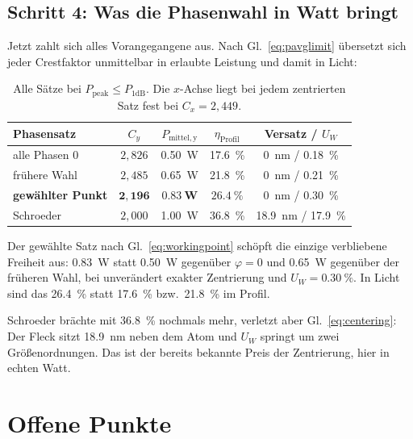 \documentclass[11pt,a4paper]{article}
\newcommand{\crest}{\ensuremath{C}}
\newcommand{\Uw}{\ensuremath{U_W}}
\begin{document}
\subsection{Schritt 4: Was die Phasenwahl in Watt bringt}

Jetzt zahlt sich alles Vorangegangene aus. Nach Gl.~\eqref{eq:pavglimit}
übersetzt sich jeder Crestfaktor unmittelbar in erlaubte Leistung und damit in
Licht:

\begin{table}[htb]
  \centering
  \caption{Alle Sätze bei $P_\mathrm{peak}\le P_{1\mathrm{dB}}$. Die
  $x$-Achse liegt bei jedem zentrierten Satz fest bei $\crest_x=2{,}449$.}
  \label{tab:hardware}
  \begin{tabular}{lcccc}
    \toprule
    Phasensatz & $\crest_y$ & $P_\mathrm{mittel,y}$ & $\eta_\mathrm{Profil}$ & Versatz / $\Uw$\\
    \midrule
    alle Phasen $0$      & $2{,}826$ & \SI{0.50}{\watt} & \SI{17.6}{\percent} & \SI{0}{\nano\meter} / \SI{0.18}{\percent}\\
    frühere Wahl         & $2{,}485$ & \SI{0.65}{\watt} & \SI{21.8}{\percent} & \SI{0}{\nano\meter} / \SI{0.21}{\percent}\\
    \textbf{gewählter Punkt} & $\mathbf{2{,}196}$ & $\mathbf{\SI{0.83}{\watt}}$ & $\mathbf{\SI{26.4}{\percent}}$ & \SI{0}{\nano\meter} / \SI{0.30}{\percent}\\
    Schroeder            & $2{,}000$ & \SI{1.00}{\watt} & \SI{36.8}{\percent} & \SI{18.9}{\nano\meter} / \SI{17.9}{\percent}\\
    \bottomrule
  \end{tabular}
\end{table}

Der gewählte Satz nach Gl.~\eqref{eq:workingpoint} schöpft die einzige
verbliebene Freiheit aus: \SI{0.83}{\watt} statt \SI{0.50}{\watt} gegenüber
$\varphi=0$ und \SI{0.65}{\watt} gegenüber der früheren Wahl, bei unverändert
exakter Zentrierung und $\Uw=\SI{0.30}{\percent}$. In Licht sind das
\SI{26.4}{\percent} statt \SI{17.6}{\percent} bzw.\ \SI{21.8}{\percent} im
Profil.

Schroeder brächte mit \SI{36.8}{\percent} nochmals mehr, verletzt aber
Gl.~\eqref{eq:centering}: Der Fleck sitzt \SI{18.9}{\nano\meter} neben dem
Atom und $\Uw$ springt um zwei Größenordnungen. Das ist der bereits bekannte
Preis der Zentrierung, hier in echten Watt.

\section*{Offene Punkte}
\end{document}
